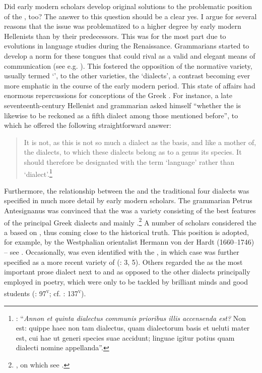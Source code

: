 Did early modern scholars develop original solutions to the problematic position of the , too? The answer to this question should be a clear yes. I argue for several reasons that the issue was problematized to a higher degree by early modern Hellenists than by their predecessors. This was for the most part due to evolutions in  language studies during the Renaissance. Grammarians started to develop a norm for these tongues that could rival  as a valid and elegant means of communication (see e.g. \citealt{Giard1992}). This fostered the opposition of the normative variety, usually termed ‘’, to the other varieties, the ‘dialects’, a contrast becoming ever more emphatic in the course of the early modern period. This state of affairs had enormous repercussions for conceptions of the Greek . For instance, a late seventeenth-century Hellenist and grammarian asked himself “whether the  is likewise to be reckoned as a fifth dialect among those mentioned before”, to which he offered the following straightforward answer:

\begin{quote}
It is not, as this is not so much a dialect as the basis, and like a mother of, the dialects, to which these dialects belong as to a genus its species. It should therefore be designated with the term ‘language’ rather than ‘dialect’.\footnote{\citet[495]{Ursin1691}: “\textit{Annon et quinta dialectus communis prioribus illis accensenda est?} Non est: quippe haec non tam dialectus, quam dialectorum basis et ueluti mater est, cui hae ut generi species suae accidunt; linguae igitur potius quam dialecti nomine appellanda”.}
\end{quote}

Furthermore, the relationship between the  and the traditional four dialects was specified in much more detail by early modern scholars. The  grammarian Petrus Antesignanus was convinced that the  was a variety consisting of the best features of the principal Greek dialects and mainly .\footnote{\citet[12--13]{Antesignanus1554}, on which see \citet[130--131]{VanRooy2016c}.} A number of scholars considered the  a  based on , thus coming close to the historical truth. This position is adopted, for example, by the Westphalian orientalist Hermann von der Hardt (1660–1746) – see \citet[17--18]{Von1705}. Occasionally,  was even identified with the , in which case  was further specified as a more recent variety of  (\citealt{Georgi1733}: 3, 5). Others regarded the  as the most important prose dialect next to  and as opposed to the other dialects principally employed in poetry, which were only to be tackled by brilliant minds and good students (\citealt{Vives1531}: 97\textsc{\textsuperscript{v}}; cf. \citealt{Vuidius1569}: 137\textsc{\textsuperscript{v}}).

